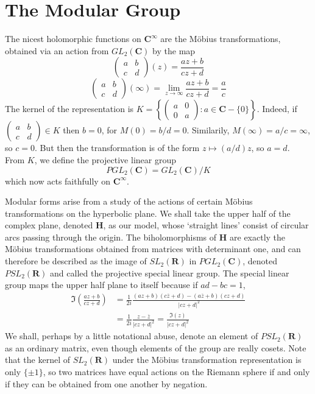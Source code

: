 \section{The Modular Group}

The nicest holomorphic functions on $\mathbf{C}^\infty$ are the M\"{o}bius transformations, obtained via an action from $GL_2(\mathbf{C})$ by the map
%
\[ \begin{pmatrix} a & b \\ c & d \end{pmatrix}(z)  = \frac{az + b}{cz + d} \]
%
\[ \begin{pmatrix} a & b \\ c & d \end{pmatrix}(\infty) = \lim_{z \to \infty } \frac{az + b}{cz + d} = \frac{a}{c} \]
%
The kernel of the representation is $K = \left\{ \left( \begin{smallmatrix} a & 0 \\ 0 & a \end{smallmatrix} \right) : a \in \mathbf{C} - \{ 0 \} \right\}$. Indeed, if $\left( \begin{smallmatrix} a & b \\ c & d \end{smallmatrix} \right) \in K$ then $b = 0$, for $M(0) = b/d = 0$. Similarily, $M(\infty) = a/c = \infty$, so $c = 0$. But then the transformation is of the form $z \mapsto (a/d) z$, so $a = d$. From $K$, we define the projective linear group
%
\[ PGL_2(\mathbf{C}) = GL_2(\mathbf{C})/K \]
%
which now acts faithfully on $\mathbf{C}^\infty$.

Modular forms arise from a study of the actions of certain M\"{o}bius transformations on the hyperbolic plane. We shall take the upper half of the complex plane, denoted $\mathbf{H}$, as our model, whose `straight lines' consist of circular arcs passing through the origin. The biholomorphisms of $\mathbf{H}$ are exactly the M\"{o}bius transformations obtained from matrices with determinant one, and can therefore be described as the image of $SL_2(\mathbf{R})$ in $PGL_2(\mathbf{C})$, denoted $PSL_2(\mathbf{R})$ and called the projective special linear group. The special linear group maps the upper half plane to itself because if $ad - bc = 1$,
%
\begin{align*}
    \Im \left( \frac{az + b}{cz + d} \right) &= \frac{1}{2i} \frac{(az + b)(c\overline{z} + d) - (a\overline{z} + b)(cz + d)}{|cz + d|^2}\\
    &= \frac{1}{2i} \frac{z - \overline{z}}{|cz + d|^2} = \frac{\Im(z)}{|cz+d|^2}
\end{align*}
%
We shall, perhaps by a little notational abuse, denote an element of $PSL_2(\mathbf{R})$ as an ordinary matrix, even though elements of the group are really cosets. Note that the kernel of $SL_2(\mathbf{R})$ under the M\"{o}bius transformation representation is only $\{ \pm 1 \}$, so two matrices have equal actions on the Riemann sphere if and only if they can be obtained from one another by negation.

